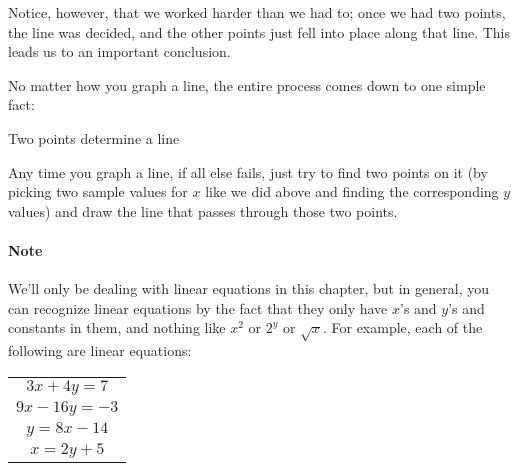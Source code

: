 \begin{center}
\end{center}
\vfill
\pagebreak

Notice, however, that we worked harder than we had to; once we had two points, the line was decided, and the other points just fell into place along that line.  This leads us to an important conclusion.

No matter how you graph a line, the entire process comes down to one simple fact:
\vspace{0.25in}
\begin{center}
\begin{minipage}{0.4\textwidth}
\begin{tcolorbox}[colframe=brown!40,colback=brown!10,sharp corners=all]
\begin{center}
Two points determine a line
\end{center}
\end{tcolorbox}
\end{minipage}
\end{center}
\vspace{0.25in}

Any time you graph a line, if all else fails, just try to find two points on it (by picking two sample values for $x$ like we did above and finding the corresponding $y$ values) and draw the line that passes through those two points.

\paragraph{Note} We'll only be dealing with linear equations in this chapter, but in general, you can recognize linear equations by the fact that they only have $x$'s and $y$'s and constants in them, and nothing like $x^2$ or $2^y$ or $\sqrt{x}$.  For example, each of the following are linear equations:
\begin{center}
\begin{tabular}{c}
$3x+4y=7$\\
$9x-16y=-3$\\
$y=8x-14$\\
$x=2y+5$
\end{tabular}
\end{center}
\vspace{0.5in}

